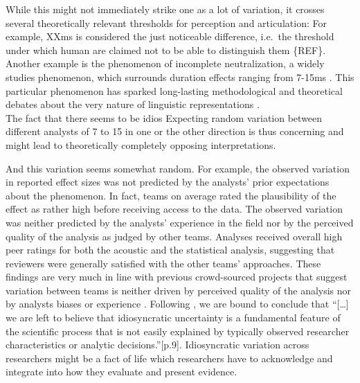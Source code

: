 \documentclass[Review,times,sageh]{sagej}
\begin{document}
While this might not immediately strike one as a lot of variation, it crosses several theoretically relevant thresholds for perception and articulation:
For example, XXms is considered the just noticeable difference, i.e.~the threshold under which human are claimed not to be able to distinguish them \{REF\}.
Another example is the phenomenon of incomplete neutralization, a widely studies phenomenon, which surrounds duration effects ranging from 7-15ms \citep{nicenboim2018using}.
This particular phenomenon has sparked long-lasting methodological and theoretical debates about the very nature of linguistic representations \citep{port2005against}.\\
The fact that there seems to be idios
Expecting random variation between different analysts of 7 to 15 in one or the other direction is thus concerning and might lead to theoretically completely opposing interpretations.

And this variation seems somewhat random.
For example, the observed variation in reported effect sizes was not predicted by the analysts' prior expectations about the phenomenon.
In fact, teams on average rated the plausibility of the effect as rather high before receiving access to the data.
The observed variation was neither predicted by the analysts' experience in the field nor by the perceived quality of the analysis as judged by other teams.
Analyses received overall high peer ratings for both the acoustic and the statistical analysis, suggesting that reviewers were generally satisfied with the other teams' approaches.
These findings are very much in line with previous crowd-sourced projects that suggest variation between teams is neither driven by perceived quality of the analysis nor by analysts biases or experience \citep[e.g.,][\citet{breznau2021observing}]{silberzahn2018many}.
Following \citet{breznau2021observing}, we are bound to conclude that ``{[}\ldots{]} we are left to believe that idiosyncratic uncertainty is a fundamental feature of the scientific process that is not easily explained by typically observed researcher characteristics or analytic decisions.''{[}p.9{]}.
Idiosyncratic variation across researchers might be a fact of life which researchers have to acknowledge and integrate into how they evaluate and present evidence.
\end{document}
